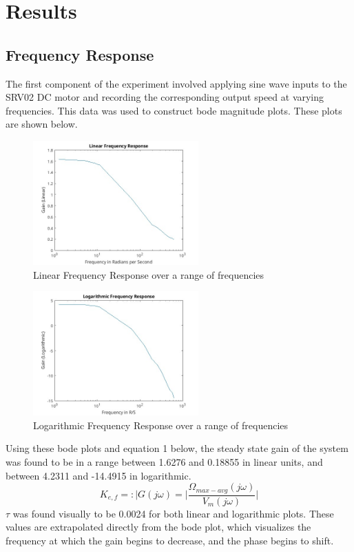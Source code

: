 \documentclass[conference,compsoc]{IEEEtran}
\begin{document}
\section{Results}

\subsection{Frequency Response}
The first component of the experiment involved applying sine wave inputs to the SRV02 DC motor and recording the corresponding output speed at varying frequencies. This data was used to construct bode magnitude plots. These plots are shown below.

\begin{figure}[!t]
  \centering
  \includegraphics[width=2.5in]{LinearFrequencyResponse.jpg}
  \caption{Linear Frequency Response over a range of frequencies}
  \label{fig_sim}
\end{figure}

\begin{figure}[!t]
  \centering
  \includegraphics[width=2.5in]{LogFrequencyResponse.jpg}
  \caption{Logarithmic Frequency Response over a range of frequencies}
  \label{fig_sim}
\end{figure}

Using these bode plots and equation 1 below, the steady state gain of the system was found to be in a range between 1.6276 and 0.18855 in linear units, and between 4.2311 and -14.4915 in logarithmic.
\begin{equation}
  K_{e,f}=:|G(j\omega)=|\frac{\Omega_{max-avg}(j\omega)}{V_m(j\omega)}|
\end{equation}
$\tau$ was found visually to be 0.0024 for both linear and logarithmic plots. These values are extrapolated directly from the bode plot, which visualizes the frequency at which the gain begins to decrease, and the phase begins to shift.
\end{document}
